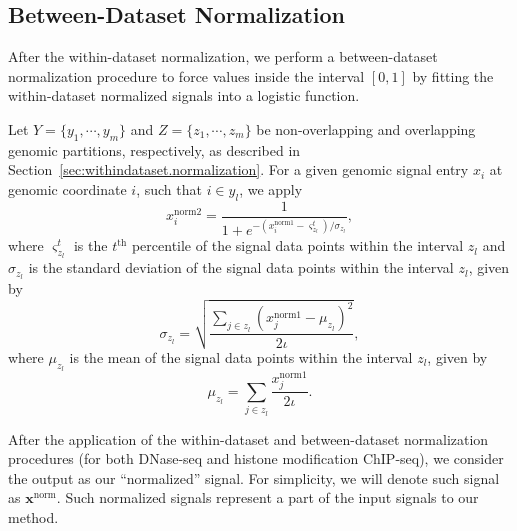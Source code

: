 \subsection{Between-Dataset Normalization}
\label{sec:betweendataset.normalization}

After the within-dataset normalization, we perform a between-dataset normalization procedure to force values inside the interval $ [0,1] $ by fitting the within-dataset normalized signals into a logistic function.

Let ${Y} = \{ {y}_{1}, \cdots, {y}_{m} \}$ and ${Z} = \{ {z}_{1}, \cdots, {z}_{m} \}$ be non-overlapping and overlapping genomic partitions, respectively, as described in Section~\ref{sec:withindataset.normalization}. For a given genomic signal entry $x_i$ at genomic coordinate $i$, such that $i \in {y}_{l}$, we apply
\begin{equation}
  \label{eq:signal.between.norm.local}
  {x}^{\text{norm2}}_{i} = \frac{1}{1+e^{{-({x}^{\text{norm1}}_{i}-{\varsigma}^{t}_{{z}_{l}})}/{\sigma}_{{z}_{l}}}},
\end{equation}
where ${\varsigma}^{t}_{{z}_{l}}$ is the $t^{\text{th}}$ percentile of the signal data points within the interval ${z}_{l}$ and $\sigma_{{z}_{l}}$ is the standard deviation of the signal data points within the interval ${z}_{l}$, given by
\begin{equation}
  \label{eq:signal.between.var.local}
  \sigma_{{z}_{l}} = \sqrt{ \frac{\sum_{j \in {z}_{l}} \left({x}^{\text{norm1}}_{j} - \mu_{{z}_{l}}\right)^2}{2\iota} },
\end{equation}
where $\mu_{{z}_{l}}$ is the mean of the signal data points within the interval ${z}_{l}$, given by
\begin{equation}
  \label{eq:signal.between.mean.local}
  \mu_{{z}_{l}} = \sum_{j \in {z}_{l}} \frac{{x}^{\text{norm1}}_{j}}{2\iota}.
\end{equation}

After the application of the within-dataset and between-dataset normalization procedures (for both DNase-seq and histone modification ChIP-seq), we consider the output as our ``normalized'' signal. For simplicity, we will denote such signal as $\mathbf{x}^{\text{norm}}$. Such normalized signals represent a part of the input signals to our method.

